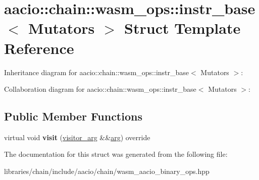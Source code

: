 \hypertarget{structaacio_1_1chain_1_1wasm__ops_1_1instr__base}{}\section{aacio\+:\+:chain\+:\+:wasm\+\_\+ops\+:\+:instr\+\_\+base$<$ Mutators $>$ Struct Template Reference}
\label{structaacio_1_1chain_1_1wasm__ops_1_1instr__base}


Inheritance diagram for aacio\+:\+:chain\+:\+:wasm\+\_\+ops\+:\+:instr\+\_\+base$<$ Mutators $>$\+:


Collaboration diagram for aacio\+:\+:chain\+:\+:wasm\+\_\+ops\+:\+:instr\+\_\+base$<$ Mutators $>$\+:
\subsection*{Public Member Functions}
\begin{DoxyCompactItemize}
\item 
\mbox{\label{structaacio_1_1chain_1_1wasm__ops_1_1instr__base_a4db7cee5935c80e6d4ff2329c13d5385}} 
virtual void {\bfseries visit} (\mbox{\hyperlink{structaacio_1_1chain_1_1wasm__ops_1_1visitor__arg}{visitor\+\_\+arg}} \&\&\mbox{\hyperlink{unionarg}{arg}}) override
\end{DoxyCompactItemize}


The documentation for this struct was generated from the following file\+:\begin{DoxyCompactItemize}
\item 
libraries/chain/include/aacio/chain/wasm\+\_\+aacio\+\_\+binary\+\_\+ops.\+hpp\end{DoxyCompactItemize}

